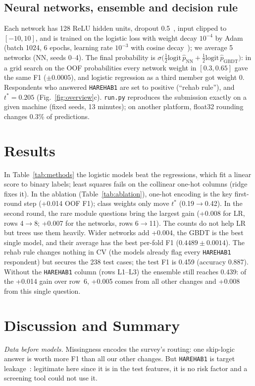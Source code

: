 \documentclass[10pt,conference,compsocconf]{IEEEtran}
\newcommand{\hare}{\texttt{HAREHAB1}}
\begin{document}
\subsection{Neural networks, ensemble and decision rule}
Each network has 128 ReLU hidden units, dropout 0.5~\cite{dropout}, input clipped to $[-10,10]$, and is trained on the logistic loss with weight decay $10^{-4}$ by Adam~\cite{adam} (batch 1024, 6 epochs, learning rate $10^{-3}$ with cosine decay~\cite{sgdr}); we average 5 networks (NN, seeds 0--4).
The final probability is $\sigma\big(\tfrac12\mathrm{logit}\,\hat p_{\mathrm{NN}}+\tfrac12\mathrm{logit}\,\hat p_{\mathrm{GBDT}}\big)$: in a grid search on the OOF probabilities every network weight in $[0.3,0.65]$ gave the same F1 ($\pm0.0005$), and logistic regression as a third member got weight 0.
Respondents who answered \hare{} are set to positive (``rehab rule''), and $t^\ast=0.205$ (Fig.~\ref{fig:overview}c).
\texttt{run.py} reproduces the submission exactly on a given machine (fixed seeds, 13 minutes); on another platform, float32 rounding changes 0.3\% of predictions.




\section{Results}
\label{sec:results}
In Table~\ref{tab:methods} the logistic models beat the regressions, which fit a linear score to binary labels; least squares fails on the collinear one-hot columns (ridge fixes it).
In the ablation (Table~\ref{tab:ablation}), one-hot encoding is the key first-round step (+0.014 OOF F1); class weights only move $t^\ast$ (0.19$\to$0.42).
In the second round, the rare module questions bring the largest gain (+0.008 for LR, rows 4$\to$8; +0.007 for the networks, rows 6$\to$11).
The counts do not help LR but trees use them heavily.
Wider networks add +0.004, the GBDT is the best single model, and their average has the best per-fold F1 ($0.4489\pm0.0014$).
The rehab rule changes nothing in CV (the models already flag every \hare{} respondent) but secures the 238 test cases; the test F1 is 0.459 (accuracy 0.887).
Without the \hare{} column (rows L1--L3) the ensemble still reaches 0.439: of the +0.014 gain over row~6, +0.005 comes from all other changes and +0.008 from this single question.

\section{Discussion and Summary}
\emph{Data before models.} Missingness encodes the survey's routing: one skip-logic answer is worth more F1 than all our other changes.
But \hare{} is target leakage~\cite{leakage}: legitimate here since it is in the test features, it is no risk factor and a screening tool could not use it.
\end{document}
